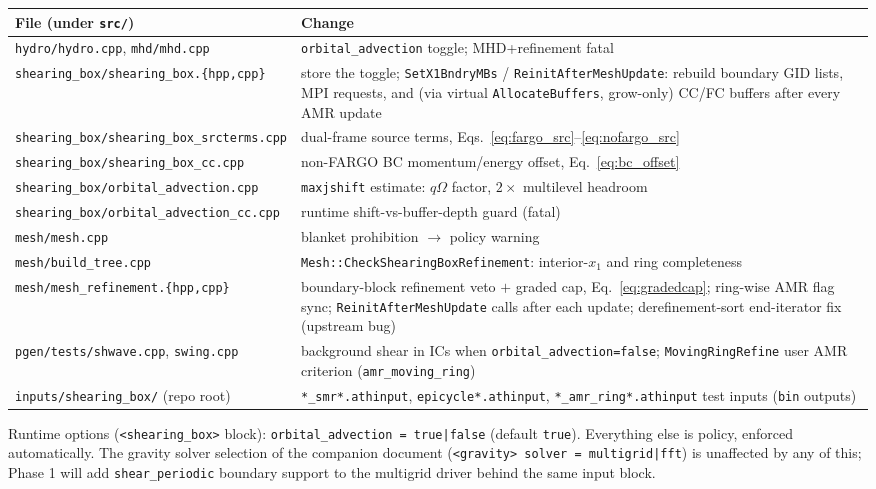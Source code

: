 \documentclass[11pt]{article}
\newcommand{\code}[1]{\texttt{#1}}
\begin{document}
\begin{center}
\small
\begin{tabular}{@{}lp{}@{}}
\toprule
File (under \code{src/}) & Change \\
\midrule
\code{hydro/hydro.cpp}, \code{mhd/mhd.cpp} &
  \code{orbital\_advection} toggle; MHD+refinement fatal \\
\code{shearing\_box/shearing\_box.\{hpp,cpp\}} & store the toggle;
  \code{SetX1BndryMBs} / \code{ReinitAfterMeshUpdate}: rebuild boundary GID lists,
  MPI requests, and (via virtual \code{AllocateBuffers}, grow-only) CC/FC buffers
  after every AMR update \\
\code{shearing\_box/shearing\_box\_srcterms.cpp} &
  dual-frame source terms, Eqs.~\eqref{eq:fargo_src}--\eqref{eq:nofargo_src} \\
\code{shearing\_box/shearing\_box\_cc.cpp} &
  non-FARGO BC momentum/energy offset, Eq.~\eqref{eq:bc_offset} \\
\code{shearing\_box/orbital\_advection.cpp} &
  \code{maxjshift} estimate: $q\Omega$ factor, $2\times$ multilevel headroom \\
\code{shearing\_box/orbital\_advection\_cc.cpp} &
  runtime shift-vs-buffer-depth guard (fatal) \\
\code{mesh/mesh.cpp} & blanket prohibition $\to$ policy warning \\
\code{mesh/build\_tree.cpp} &
  \code{Mesh::CheckShearingBoxRefinement}: interior-$x_1$ and ring completeness \\
\code{mesh/mesh\_refinement.\{hpp,cpp\}} &
  boundary-block refinement veto $+$ graded cap, Eq.~\eqref{eq:gradedcap};
  ring-wise AMR flag sync; \code{ReinitAfterMeshUpdate} calls after each update;
  derefinement-sort end-iterator fix (upstream bug) \\
\code{pgen/tests/shwave.cpp}, \code{swing.cpp} &
  background shear in ICs when \code{orbital\_advection=false};
  \code{MovingRingRefine} user AMR criterion (\code{amr\_moving\_ring}) \\
\code{inputs/shearing\_box/} (repo root) &
  \code{*\_smr*.athinput}, \code{epicycle*.athinput},
  \code{*\_amr\_ring*.athinput} test inputs (\code{bin} outputs) \\
\bottomrule
\end{tabular}
\end{center}

Runtime options (\code{<shearing\_box>} block): \code{orbital\_advection = true|false}
(default \code{true}). Everything else is policy, enforced automatically. The gravity
solver selection of the companion document (\code{<gravity> solver = multigrid|fft})
is unaffected by any of this; Phase 1 will add \code{shear\_periodic} boundary
support to the multigrid driver behind the same input block.
\end{document}
